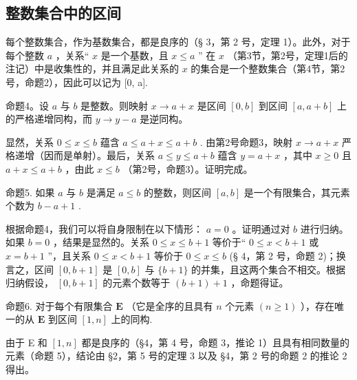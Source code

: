 \subsection{整数集合中的区间}

每个整数集合，作为基数集合，都是良序的（§ 3，第 2 号，定理 1）。此外，对于每个整数 \(a\) ，关系“ \(x\) 是一个基数，且 \(x \leqslant a\) '' 在 \(x\) （第3节，第2号，定理1后的注记）中是收集性的，并且满足此关系的 \(x\) 的集合是一个整数集合（第4节，第2号，命题2），因此可以记为 {[}0, a{]}.

命题4。设 \(a\) 与 \(b\) 是整数。则映射 \(x \to a + x\) 是区间 \([0, b]\) 到区间 \([a, a + b]\) 上的严格递增同构，而 \(y \to y - a\) 是逆同构。

显然，关系 \(0 \leqslant x \leqslant b\) 蕴含 \(a \leqslant a + x \leqslant a + b\) . 由第2号命题3，映射 \(x \to a + x\) 严格递增（因而是单射）。最后，关系 \(a \leqslant y \leqslant a + b\) 蕴含 \(y = a + x\) ，其中 \(x \geqslant 0\) 且 \(a + x \leqslant a + b\) ，由此 \(x \leqslant b\) （第2号，命题3）。证明完成。

命题5. 如果 \(a\) 与 \(b\) 是满足 \(a \leqslant b\) 的整数，则区间 \([a, b]\) 是一个有限集合，其元素个数为 \(b - a + 1\) .

根据命题4，我们可以将自身限制在以下情形： \(a=0\) 。证明通过对 \(b\) 进行归纳。如果 \(b=0\) ，结果是显然的。关系 \(0 \leqslant x \leqslant b+1\) 等价于“ \(0 \leqslant x < b+1\) 或 \(x=b+1\) ''，且关系 \(0 \leqslant x < b+1\) 等价于 \(0 \leqslant x \leqslant b\) (§ 4，第 2 号，命题 2)；换言之，区间 \([0, b+1]\) 是 \([0, b]\) 与 \(\{b+1\}\) 的并集，且这两个集合不相交。根据归纳假设， \([0, b+1]\) 的元素个数等于 \((b+1)+1\) ，命题得证。

命题6. 对于每个有限集合 \(\mathbf{E}\) （它是全序的且具有 \(n\) 个元素 \((n \geqslant 1)\) ），存在唯一的从 \(\mathbf{E}\) 到区间 \([1, n]\) 上的同构.

由于 E 和 \([1, n]\) 都是良序的（§4，第 4 号，命题 3，推论 1）且具有相同数量的元素（命题 5），结论由 §2，第 5 号的定理 3 以及 §4，第 2 号的命题 2 的推论 2 得出。

